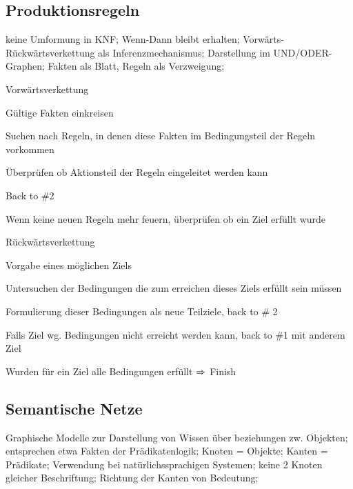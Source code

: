 \documentclass[german,color,6pt]{latex4ei/latex4ei_sheet}
\begin{document}
\begin{sectionbox}
\subsection{Produktionsregeln}
keine Umformung in KNF; Wenn-Dann bleibt erhalten; Vorwärts- Rückwärtsverkettung als Inferenzmechanismus; Darstellung im UND/ODER-Graphen; Fakten als Blatt, Regeln als Verzweigung;
\end{sectionbox}

\begin{sectionbox}
\begin{cookbox}{Vorwärtsverkettung}
	\item Gültige Fakten einkreisen
	\item Suchen nach Regeln, in denen diese Fakten im Bedingungsteil der Regeln vorkommen
	\item Überprüfen ob Aktionsteil der Regeln eingeleitet werden kann
	\item Back to \#2
	\item Wenn keine neuen Regeln mehr feuern, überprüfen ob ein Ziel erfüllt wurde
\end{cookbox}

\begin{cookbox}{Rückwärtsverkettung}
	\item Vorgabe eines möglichen Ziels
	\item Untersuchen der Bedingungen die zum erreichen dieses Ziels erfüllt sein müssen
	\item Formulierung dieser Bedingungen als neue Teilziele, back to \# 2
	\item Falls Ziel wg. Bedingungen nicht erreicht werden kann, back to \#1 mit anderem Ziel
	\item Wurden für ein Ziel alle Bedingungen erfüllt $\Rightarrow$ Finish
\end{cookbox}
\end{sectionbox}

\begin{sectionbox}
\subsection{Semantische Netze}
Graphische Modelle zur Darstellung von Wissen über beziehungen zw. Objekten; entsprechen etwa Fakten der Prädikatenlogik; Knoten = Objekte; Kanten = Prädikate; Verwendung bei natürlichssprachigen Systemen; keine 2 Knoten gleicher Beschriftung; Richtung der Kanten von Bedeutung;
\end{sectionbox}
\end{document}
